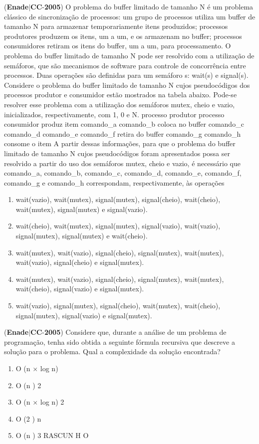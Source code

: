 \documentclass{exam}
\begin{document}
\begin{questions}
\begin{enumerate}[label=\alph*)]
	\end{enumerate}

\question (\textbf{Enade}$|$\textbf{CC}-\textbf{2005}) O problema do buffer limitado de tamanho N é um
problema clássico de sincronização de processos: um grupo de
processos utiliza um buffer de tamanho N para armazenar
temporariamente itens produzidos; processos produtores
produzem os itens, um a um, e os armazenam no buffer;
processos consumidores retiram os itens do buffer, um a um,
para processamento. O problema do buffer limitado de tamanho
N pode ser resolvido com a utilização de semáforos, que são
mecanismos de software para controle de concorrência entre
processos. Duas operações são definidas para um semáforo
s: wait(s) e signal(s).
Considere o problema do buffer limitado de tamanho N
cujos pseudocódigos dos processos produtor e consumidor
estão mostrados na tabela abaixo. Pode-se resolver esse
problema com a utilização dos semáforos mutex, cheio e vazio,
inicializados, respectivamente, com 1, 0 e N.
processo produtor processo consumidor
produz item
comando\_a
comando\_b
coloca no buffer
comando\_c
comando\_d
comando\_e
comando\_f
retira do buffer
comando\_g
comando\_h
consome o item
A partir dessas informações, para que o problema do buffer
limitado de tamanho N cujos pseudocódigos foram
apresentados possa ser resolvido a partir do uso dos semáforos
mutex, cheio e vazio, é necessário que comando\_a,
comando\_b, comando\_c, comando\_d, comando\_e,
comando\_f, comando\_g e comando\_h correspondam,
respectivamente, às operações
	\begin{enumerate}[label=\alph*)]
		\item  wait(vazio), wait(mutex), signal(mutex),
signal(cheio), wait(cheio), wait(mutex),
signal(mutex) e signal(vazio).
		\item  wait(cheio), wait(mutex), signal(mutex),
signal(vazio), wait(vazio), signal(mutex),
signal(mutex) e wait(cheio).
		\item  wait(mutex), wait(vazio), signal(cheio),
signal(mutex), wait(mutex), wait(vazio),
signal(cheio) e signal(mutex).
		\item  wait(mutex), wait(vazio), signal(cheio),
signal(mutex), wait(mutex), wait(cheio),
signal(vazio) e signal(mutex).
		\item  wait(vazio), signal(mutex), signal(cheio),
wait(mutex), wait(cheio), signal(mutex),
signal(vazio) e signal(mutex).

	\end{enumerate}

\question (\textbf{Enade}$|$\textbf{CC}-\textbf{2005}) Considere que, durante a análise de um problema de programação,
tenha sido obtida a seguinte fórmula recursiva que descreve a
solução para o problema.
Qual a complexidade da solução encontrada?
	\begin{enumerate}[label=\alph*)]
		\item  O (n × log n)
		\item  O (n )
2
		\item  O (n × log n)
2
		\item  O (2 )
n
		\item  O (n )
3
RASCUN H O


\end{enumerate}
\end{questions}
\end{document}
